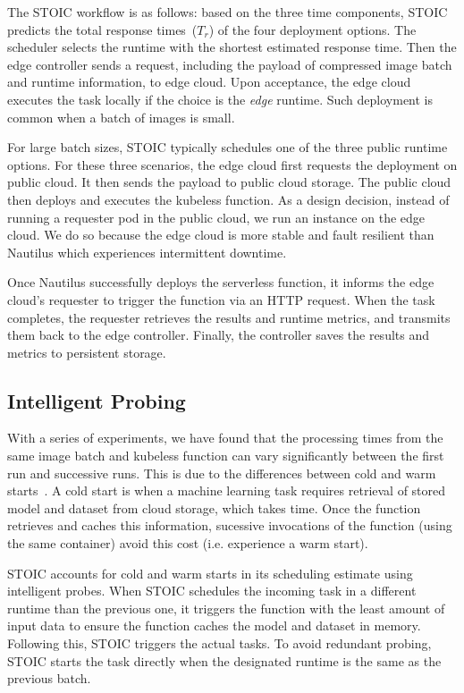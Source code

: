  
 
 The STOIC workflow is as follows: based on the three time components, STOIC predicts the total response times~($T_r$) of the four deployment options. The scheduler selects the runtime with the shortest estimated response time. Then the edge controller sends a request, including the payload of compressed image batch and runtime information, to edge cloud. Upon acceptance, the edge cloud executes the task locally if the choice is the \textit{edge} runtime. Such deployment is common when a batch of images is small. 

For large batch sizes, STOIC typically schedules one of the three public runtime options. For these three scenarios, the edge cloud first requests the deployment on public cloud. It then sends the payload to public cloud storage. The public cloud then deploys and executes the kubeless function. As a design decision, instead of running a requester pod in the public cloud, we run an instance on the edge cloud. We do so because the edge cloud is more stable and fault resilient than Nautilus which experiences intermittent downtime.  
 
Once Nautilus successfully deploys the serverless function, it informs the edge cloud's requester to trigger the function via an HTTP request. When the task completes, the requester retrieves the results and runtime metrics, and transmits them back to the edge controller. Finally, the controller saves the results and metrics to persistent storage. 
 
 \subsection{Intelligent Probing}
 With a series of experiments, we have found that the processing times from the same image batch and kubeless function can vary significantly between the first run and successive runs. This is due to the differences between cold and warm starts~\cite{ref:coldstart}.  A cold start is when a machine learning task requires retrieval of stored model and dataset from cloud storage, which takes time. Once the function retrieves and caches this information, sucessive invocations of the function (using the same container) avoid this cost (i.e. experience a warm start). 

STOIC accounts for cold and warm starts in its scheduling estimate using intelligent probes. When STOIC schedules the incoming task in a different runtime than the previous one, it triggers the function with the least amount of input data to ensure the function caches the model and dataset in memory. Following this, STOIC triggers the actual tasks. To avoid redundant probing, STOIC starts the task directly when the designated runtime is the same as the previous batch.
